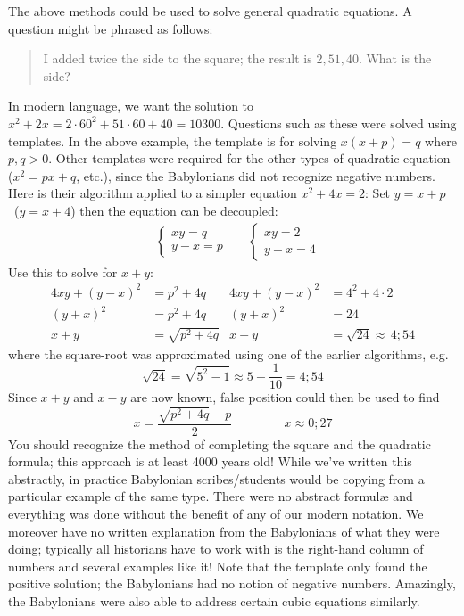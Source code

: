 The above methods could be used to solve general quadratic equations. A question might be phrased as follows:
\begin{quote}
	I added twice the side to the square; the result is $2,51,40$. What is the side?
\end{quote}
In modern language, we want the solution to $x^2+2x=2\cdot 60^2+51\cdot 60+40=10300$.\smallbreak
Questions such as these were solved using templates. In the above example, the template is for solving $x(x+p)=q$ where $p,q>0$. Other templates were required for the other types of quadratic equation ($x^2=px+q$, etc.), since the Babylonians did not recognize negative numbers. Here is their algorithm applied to a simpler equation $x^2+4x=2$:\smallbreak
Set $y=x+p$ \ ($y=x+4$) then the equation can be decoupled:
\begin{align*}
	&
	\begin{cases}
		xy=q\\
		y-x=p
	\end{cases}
	&&
	\begin{cases}
		xy=2\\
		y-x=4
	\end{cases}
\end{align*}
Use this to solve for $x+y$:
\begin{align*}
	4xy+(y-x)^2&=p^2+4q &4xy+(y-x)^2&=4^2+4\cdot 2\\
	(y+x)^2&=p^2+4q &(y+x)^2&=24\\
	x+y&=\sqrt{p^2+4q} &x+y&=\sqrt{24}\approx\,4;54
\end{align*}
where the square-root was approximated using one of the earlier algorithms, e.g.
\[
	\sqrt{24}=\sqrt{5^2-1}\approx 5-\frac{1}{10}=4;54
\]
Since $x+y$ and $x-y$ are now known, false position could then be used to find
\[
	x=\frac{\sqrt{p^2+4q}-p}2 \hspace{50pt} x\approx 0;27
\]
You should recognize the method of completing the square and the quadratic formula; this approach is at least 4000 years old!
\smallbreak
While we've written this abstractly, in practice Babylonian scribes/students would be copying from a particular example of the same type. There were no abstract formulæ and everything was done without the benefit of any of our modern notation. We moreover have no written explanation from the Babylonians of what they were doing; typically all historians have to work with is the right-hand column of numbers and several examples like it!
\smallbreak
Note that the template only found the positive solution; the Babylonians had no notion of negative numbers. Amazingly, the Babylonians were also able to address certain cubic equations similarly.

